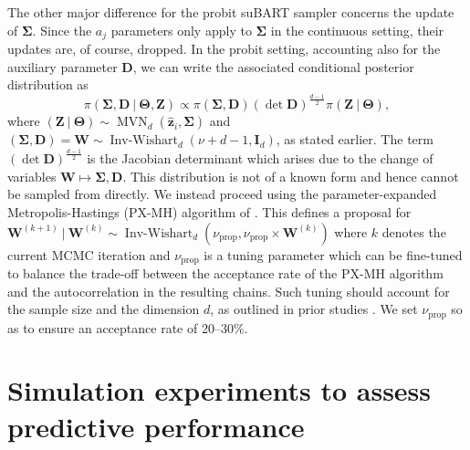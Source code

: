 \documentclass[aoas,preprint]{imsart}
\newcommand\given[1][]{\:#1\vert\:}
\theoremstyle{plain}
\theoremstyle{definition}
\theoremstyle{remark}
\begin{document}
The other major difference for the probit suBART sampler concerns the update of $\boldsymbol{\Sigma}$.
Since the $a_j$ parameters only apply to $\boldsymbol{\Sigma}$ in the continuous setting, their updates are, of course, dropped. 
In the probit setting, accounting also for the auxiliary parameter $\mathbf{D}$, we can write the associated conditional posterior distribution as 
\[\pi\left(\boldsymbol{\Sigma},\mathbf{D}\given \boldsymbol{\Theta}, \mathbf{Z}\right) \propto
    \pi\left(\boldsymbol{\Sigma},\mathbf{D}\right) \left(\det \mathbf{D}\right)^{\frac{d - 1}{2}}
     \pi\left(\mathbf{Z}\given \boldsymbol{\Theta}\right),\]
where $\left(\mathbf{Z}\given \boldsymbol{\Theta}\right) \sim \operatorname{MVN}_{d} \left( \hat{\mathbf{z}}_i, \boldsymbol{\Sigma} \right)$ and 
$(\boldsymbol{\Sigma},\mathbf{D}) = \mathbf{W} \sim \operatorname{Inv-Wishart}_d (\nu + d - 1, \mathbf{I}_d)$, as stated earlier. 
The term $(\det \mathbf{D})^{\frac{d - 1}{2}}$ is the Jacobian determinant which arises due to the change of variables $\mathbf{W} \mapsto \boldsymbol{\Sigma},\mathbf{D}$.
This distribution is not of a known form and hence cannot be sampled from directly.
We instead proceed using the parameter-expanded Metropolis-Hastings (PX-MH) algorithm of \citet{zhang2020parameter}. This defines a proposal for $\mathbf{W}^{(k+1)} \given \mathbf{W}^{(k)} \sim 
 \operatorname{Inv-Wishart}_{d}\left(\nu_{\operatorname{prop}}, \nu_{\operatorname{prop}} \times \mathbf{W}^{(k)} \right)$ where $k$ denotes the current MCMC iteration and $\nu_{\operatorname{prop}}$ is a tuning parameter which can be fine-tuned to balance the trade-off between the acceptance rate of the PX-MH algorithm and the autocorrelation in the resulting chains. Such tuning should account for the sample size and the dimension $d$, as outlined in prior studies \citep{zhang2006sampling}. We set $\nu_{\operatorname{prop}}$ so as to ensure an acceptance rate of 20--30\%.

\section{Simulation experiments to assess predictive performance}\label{sec:simstudies}
\end{document}
